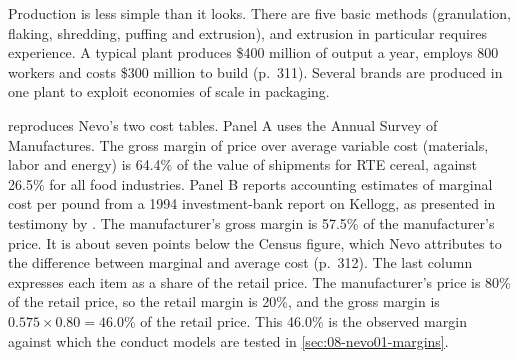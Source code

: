 Production is less simple than it looks. There are five basic methods (granulation, flaking, shredding,
puffing and extrusion), and extrusion in particular requires experience. A typical plant produces \$400
million of output a year, employs 800 workers and costs \$300 million to build (p.~311). Several brands are
produced in one plant to exploit economies of scale in packaging.

 reproduces Nevo's two cost tables. Panel A uses the Annual Survey of Manufactures.
The gross margin of price over average variable cost (materials, labor and energy) is 64.4\% of the value of
shipments for RTE cereal, against 26.5\% for all food industries. Panel B reports accounting estimates of
marginal cost per pound from a 1994 investment-bank report on Kellogg, as presented in testimony by
\citet{Cotterill1996}. The manufacturer's gross margin is 57.5\% of the manufacturer's price. It is about seven
points below the Census figure, which Nevo attributes to the difference between marginal and average cost
(p.~312). The last column expresses each item as a share of the retail price. The manufacturer's price is
80\% of the retail price, so the retail margin is 20\%, and the gross margin is
$0.575 \times 0.80 = 46.0\%$ of the retail price. This 46.0\% is the observed margin against which the
conduct models are tested in \cref{sec:08-nevo01-margins}.

